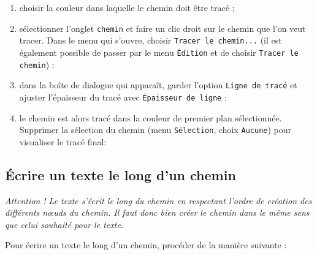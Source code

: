 \begin{enumerate}
\item choisir la couleur dans laquelle le chemin doit être tracé ;
\item sélectionner l'onglet \texttt{chemin} et faire un clic droit sur le chemin que l'on veut tracer. Dans le menu qui s'ouvre, choisir \texttt{Tracer le chemin...} (il est également possible de passer par le menu \texttt{Édition} et de choisir \texttt{Tracer le chemin}) : 
\item dans la boîte de dialogue qui apparaît, garder l'option \texttt{Ligne de tracé} et ajuster l'épaisseur du tracé avec \texttt{Épaisseur de ligne} :
\item le chemin est alors tracé dans la couleur de premier plan sélectionnée. Supprimer la sélection du chemin (menu \texttt{Sélection}, choix \texttt{Aucune}) pour visualiser le tracé final:
\end{enumerate}

\subsection{Écrire un texte le long d'un chemin}\label{Gimp3cheminTexte} 

\emph{Attention ! Le texte s'écrit le long du chemin en respectant l'ordre de création des différents nœuds du chemin. Il faut donc bien créer le chemin dans le même sens que celui souhaité pour le texte.}

\vspace{6pt}

Pour écrire un texte le long d'un chemin, procéder de la manière suivante : 

